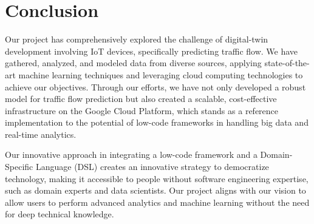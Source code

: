\section{Conclusion}

Our project has comprehensively explored the challenge of digital-twin development involving IoT devices, specifically predicting traffic flow. We have gathered, analyzed, and modeled data from diverse sources, applying state-of-the-art machine learning techniques and leveraging cloud computing technologies to achieve our objectives. Through our efforts, we have not only developed a robust model for traffic flow prediction but also created a scalable, cost-effective infrastructure on the Google Cloud Platform, which stands as a reference implementation to the potential of low-code frameworks in handling big data and real-time analytics.

Our innovative approach in integrating a low-code framework and a Domain-Specific Language (DSL) creates an innovative strategy to democratize technology, making it accessible to people without software engineering expertise, such as domain experts and data scientists. Our project aligns with our vision to allow users to perform advanced analytics and machine learning without the need for deep technical knowledge.
